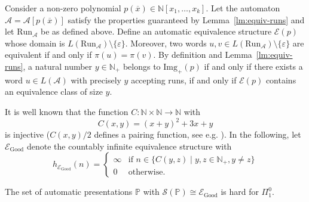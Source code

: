 \documentclass[envcountsame]{llncs}
\newcommand{\A}{\mathcal A}
\newcommand{\E}{\mathcal E}
\newcommand{\Good}{\mathrm{Good}}
\newcommand{\Img}{\mathrm{Img}}
\newcommand{\N}{\mathbb N}
\renewcommand{\P}{{\mathbb P}}
\newcommand{\Run}{\mathrm{Run}}
\renewcommand{\S}{\mathcal S}
\begin{document}
Consider a non-zero polynomial $p(\overline x)\in
\N[x_1,\ldots,x_k]$. Let the automaton $\A=\A[p(\overline{x})]$
satisfy the properties guaranteed by Lemma~\ref{lm:equiv-runs} and let
$\Run_{\A}$ be as defined above. Define an automatic equivalence
structure $\E(p)$ whose domain is $L(\Run_\A)
\setminus \{\varepsilon\}$.  Moreover,
two words $u,v \in L(\Run_\A)\setminus\{\varepsilon\}$ are equivalent
if and only if $\pi(u) = \pi(v)$. By definition and
Lemma~\ref{lm:equiv-runs}, a natural number $y \in \N_+$ belongs to
$\Img_+(p)$ if and only if there exists a word $u\in L(\A)$ with
precisely $y$ accepting runs, if and only if $\E(p)$ contains an
equivalence class of size $y$.

It is well known that the function $C: \N \times \N \to \N$ with
\begin{equation} \label{function-C}
    C(x,y) = (x+y)^2+3x+y
\end{equation}
is injective ($C(x,y)/2$ defines a pairing function, see e.g. \cite{Hon06}).  In the
following, let $\E_\Good$ denote the countably infinite equivalence
structure with
\[
h_{\E_\Good}(n)=
  \begin{cases}
    \infty & \text{if }n\in\{C(y,z)\mid y,z\in\N_+, y\neq z\}\\
    0      & \text{otherwise.}
  \end{cases}
\]

\begin{proposition}\label{P-equiv}
  The set of automatic presentations $\P$ with $\S(\P)\cong\E_\Good$ is
  hard for $\Pi^0_1$.
\end{proposition}
\end{document}
